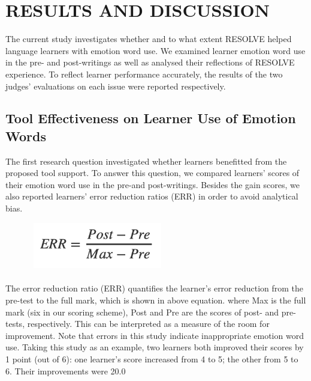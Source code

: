 \documentclass[a4paper,12pt,oneside]{article}
\begin{document}
\newpage
\section{RESULTS AND DISCUSSION}
The current study investigates whether and to what extent RESOLVE helped language learners with emotion word use. We examined learner emotion word use in the pre- and post-writings as well as analysed their reflections of RESOLVE experience. To reflect learner performance accurately, the results of the two judges’ evaluations on each issue were reported respectively. 
\subsection{Tool Effectiveness on Learner Use of Emotion Words}
The first research question investigated whether learners benefitted from the proposed tool support. To answer this question, we compared learners’ scores of their emotion word use in the pre-and post-writings. Besides the gain scores, we also reported learners’ error reduction ratios (ERR) in order to avoid analytical bias. 

\begin{figure}[H]
\includegraphics[height=2cm,width=6cm]{Equation.png}
\centering
\end{figure}

\paragraph{}
The error reduction ratio (ERR) quantifies the learner’s error reduction from the pre-test to the full mark, which is shown in above equation. where Max is the full mark (six in our scoring scheme), Post and Pre are the scores of post- and pre-tests, respectively. This can be interpreted as a measure of the room for improvement. Note that errors in this study indicate inappropriate emotion word use. Taking this study as an example, two learners both improved their scores by 1 point (out of 6): one learner’s score increased from 4 to 5; the other from 5 to 6. Their improvements were 20.0%
\end{document}
